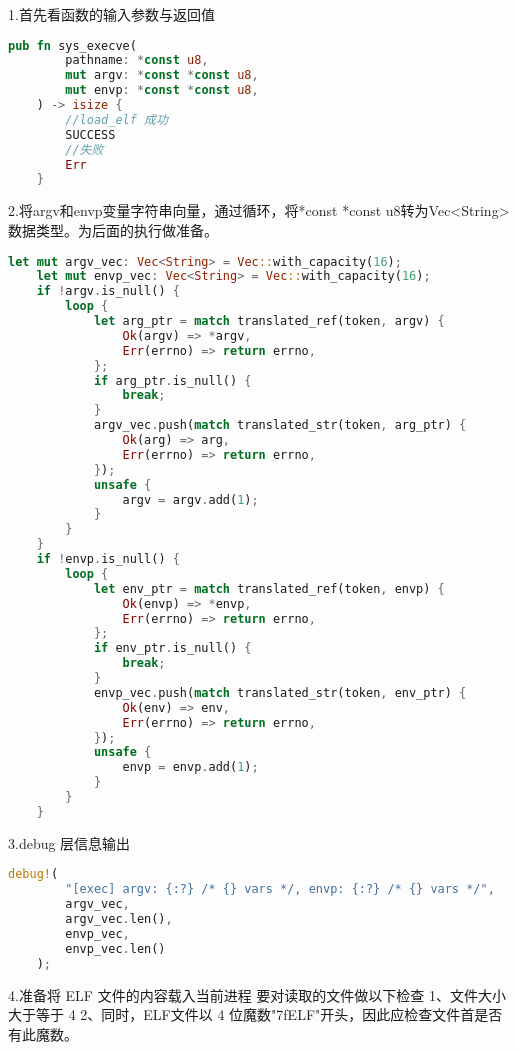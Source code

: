 1.首先看函数的输入参数与返回值
\begin{lstlisting}[language={Rust}, label={code:forktest},
    caption={forktest.rs}]
    pub fn sys_execve(
        pathname: *const u8,
        mut argv: *const *const u8,
        mut envp: *const *const u8,
    ) -> isize {
        //load_elf 成功
        SUCCESS
        //失败
        Err
    }
\end{lstlisting}
2.将argv和envp变量字符串向量，通过循环，将*const *const u8转为Vec<String>数据类型。为后面的执行做准备。
\begin{lstlisting}[language={Rust}, label={code:forktest},
    caption={forktest.rs}]
    let mut argv_vec: Vec<String> = Vec::with_capacity(16);
    let mut envp_vec: Vec<String> = Vec::with_capacity(16);
    if !argv.is_null() {
        loop {
            let arg_ptr = match translated_ref(token, argv) {
                Ok(argv) => *argv,
                Err(errno) => return errno,
            };
            if arg_ptr.is_null() {
                break;
            }
            argv_vec.push(match translated_str(token, arg_ptr) {
                Ok(arg) => arg,
                Err(errno) => return errno,
            });
            unsafe {
                argv = argv.add(1);
            }
        }
    }
    if !envp.is_null() {
        loop {
            let env_ptr = match translated_ref(token, envp) {
                Ok(envp) => *envp,
                Err(errno) => return errno,
            };
            if env_ptr.is_null() {
                break;
            }
            envp_vec.push(match translated_str(token, env_ptr) {
                Ok(env) => env,
                Err(errno) => return errno,
            });
            unsafe {
                envp = envp.add(1);
            }
        }
    }


\end{lstlisting}
3.debug 层信息输出
\begin{lstlisting}[language={Rust}, label={code:forktest},
    caption={forktest.rs}]
    debug!(
        "[exec] argv: {:?} /* {} vars */, envp: {:?} /* {} vars */",
        argv_vec,
        argv_vec.len(),
        envp_vec,
        envp_vec.len()
    );
  \end{lstlisting}
4.准备将 ELF 文件的内容载入当前进程
要对读取的文件做以下检查
    1、文件大小大于等于 4
    2、同时，ELF文件以 4 位魔数"\x7fELF"开头，因此应检查文件首是否有此魔数。
